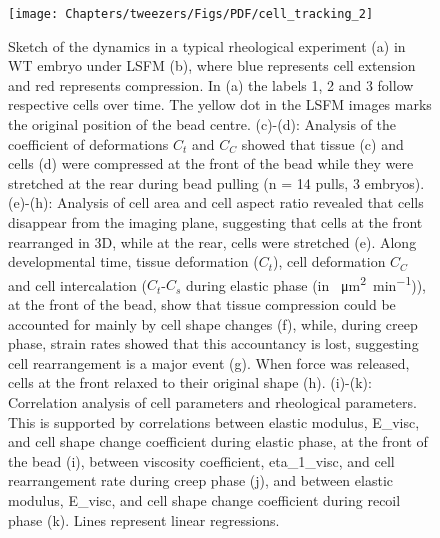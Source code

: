  \begin{figure}
 \centering
  \texttt{[image: Chapters/tweezers/Figs/PDF/cell\_tracking\_2]} %
 \caption[Sketch of the dynamics in a typical rheological experiment]{\footnotemark
 Sketch of the dynamics in a typical rheological experiment (a) in \gls{WT} embryo under \gls{LSFM} (b), where blue represents cell extension and red represents compression.
 In (a) the labels 1, 2 and 3 follow respective cells over time.
 The yellow dot in the \gls{LSFM} images marks the original position  of the bead centre.
 (c)-(d): Analysis of the coefficient of deformations \(C_t\) and \(C_C\) showed that tissue (c) and cells (d) were compressed at the front  of the bead while they were stretched at the rear during bead  pulling (n = 14 pulls, 3 embryos).
 (e)-(h): Analysis of cell area  and cell aspect ratio revealed that cells disappear from the imaging plane, suggesting that cells at the front rearranged in 3D, while at the rear, cells were stretched (e).
 Along developmental time, tissue deformation (\(C_t\)), cell deformation \(C_C\) and cell intercalation (\(C_t\)-\(C_s\) during elastic phase (in \SI{}{\micro\metre\squared\per\minute})), at the front of the bead, show that tissue compression could be accounted for mainly by cell shape changes (f), while, during creep phase, strain rates showed that this accountancy is lost, suggesting cell rearrangement is a major event (g).
 When force was released, cells at the front relaxed to their original shape (h).
 (i)-(k): Correlation analysis of cell parameters and rheological parameters.
 This is supported by correlations between elastic modulus, \gls{E_visc}, and cell shape change coefficient during elastic phase, at the front of the bead (i), between viscosity coefficient, \gls{eta_1_visc}, and cell rearrangement rate during creep phase (j), and between elastic modulus, \gls{E_visc}, and cell shape change coefficient during recoil phase (k).
 Lines represent linear regressions.
}
\end{figure}
